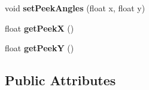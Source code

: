 \begin{DoxyCompactItemize}
\item 
\hypertarget{class_camera_controller_aa016da4be32b13b51e1cc91b9bcc1137}{
void {\bfseries setPeekAngles} (float x, float y)}
\label{class_camera_controller_aa016da4be32b13b51e1cc91b9bcc1137}

\item 
\hypertarget{class_camera_controller_af3c944b3c14afb9b275566616e7a889f}{
float {\bfseries getPeekX} ()}
\label{class_camera_controller_af3c944b3c14afb9b275566616e7a889f}

\item 
\hypertarget{class_camera_controller_a2d6cc0c02d519fc7c0a77eead8bd0cb7}{
float {\bfseries getPeekY} ()}
\label{class_camera_controller_a2d6cc0c02d519fc7c0a77eead8bd0cb7}

\end{DoxyCompactItemize}
\subsection*{Public Attributes}
